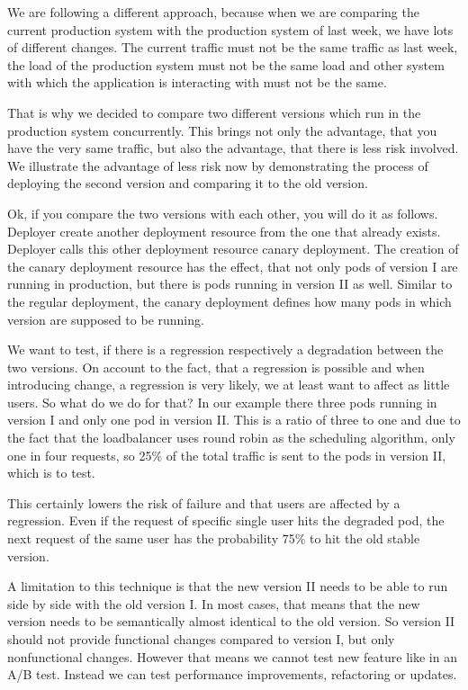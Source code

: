 We are following a different approach, because when we are comparing the current
production system with the production system of last week, we have lots of different
changes. The current traffic must not be the same traffic as last week, the load of the
production system must not be the same load and other system with which the application is
interacting with must not be the same.

That is why we decided to compare two different versions which run in the production
system concurrently. This brings not only the advantage, that you have the very same
traffic, but also the advantage, that there is less risk involved. We illustrate the
advantage of less risk now by demonstrating the process of deploying the second version
and comparing it to the old version.

Ok, if you compare the two versions with each other, you will do it as follows. Deployer
create another deployment resource from the one that already exists. Deployer calls this
other deployment resource canary deployment. The creation of the canary deployment
resource has the effect, that not only pods of version I are running in production, but
there is pods running in version II as well. Similar to the regular deployment, the canary
deployment defines how many pods in which version are supposed to be running.

We want to test, if there is a regression respectively a degradation between the two
versions. On account to the fact, that a regression is possible and when introducing
change, a regression is very likely, we at least want to affect as little users. So what
do we do for that? In our example there three pods running in version I and only one pod
in version II. This is a ratio of three to one and due to the fact that the loadbalancer
uses round robin as the scheduling algorithm, only one in four requests, so 25\% of the
total traffic is sent to the pods in version II, which is to test.

This certainly lowers the risk of failure and that users are affected by a
regression. Even if the request of specific single user hits the degraded pod, the next
request of the same user has the probability 75\% to hit the old stable version.

A limitation to this technique is that the new version II needs to be able to run side by
side with the old version I. In most cases, that means that the new version needs to be
semantically almost identical to the old version. So version II should not provide
functional changes compared to version I, but only nonfunctional changes. However that
means we cannot test new feature like in an A/B test. Instead we can test performance
improvements, refactoring or updates.

